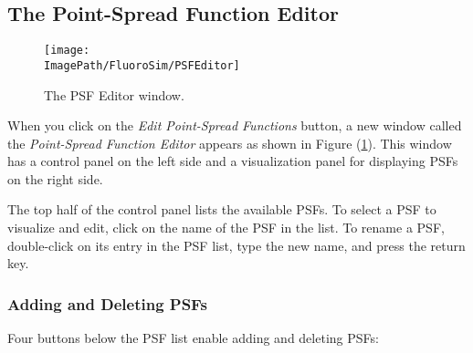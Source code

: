 \documentclass[11pt,titlepage,twoside]{article}
\begin{document}
\subsection{The Point-Spread Function Editor}
\label{sec:PointSpreadFunctionEditor}

\begin{figure}[htbp] %
   \centering
   \texttt{[image: \\ImagePath/FluoroSim/PSFEditor]} 
   \caption{The PSF Editor window.}
   \label{fig:PSFEditor}
\end{figure}

When you click on the \emph{Edit Point-Spread Functions} button, a new window called the \emph{Point-Spread Function Editor} appears as shown in Figure (\ref{fig:PSFEditor}). This window has a control panel on the left side and a visualization panel for displaying PSFs on the right side.

The top half of the control panel lists the available PSFs. To select a PSF to visualize and edit, click on the name of the PSF in the list. To rename a PSF, double-click on its entry in the PSF list, type the new name, and press the return key.

\subsubsection{Adding and Deleting PSFs}
\label{sec:AddingAndDeletingPSFs}

Four buttons below the PSF list enable adding and deleting PSFs:
\end{document}
